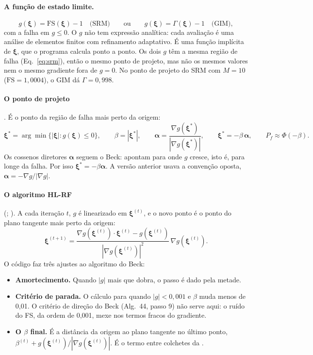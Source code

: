 \documentclass[11pt,a4paper]{article}
\newcommand{\xib}{\bm\xi}
\newcommand{\FS}{\mathrm{FS}}
\begin{document}
\paragraph{A função de estado limite.}
\begin{equation}
  g(\xib) = \FS(\xib) - 1 \quad\text{(SRM)} \qquad\text{ou}\qquad g(\xib) = \Gamma(\xib) - 1 \quad\text{(GIM)},
  \label{eq:g}
\end{equation}
com a falha em $g \le 0$. O $g$ não tem expressão analítica: cada avaliação é uma análise de elementos finitos com
refinamento adaptativo. É uma função implícita de $\xib$, que o programa calcula ponto a ponto. Os dois $g$ têm a mesma
região de falha (Eq.~\ref{eq:srm}), então o mesmo ponto de projeto, mas não os mesmos valores nem o mesmo gradiente fora
de $g = 0$. No ponto de projeto do SRM com $M = 10$ ($\FS = 1{,}0004$), o GIM dá $\Gamma = 0{,}998$.

\paragraph{O ponto de projeto} \citep[Eqs.~4.10 a 4.12 e 4.23]{beck2014}. É o ponto da região de falha mais perto da
origem:
\begin{equation}
  \xib^* = \arg\min\big\{|\xib| : g(\xib) \le 0\big\}, \qquad \beta = |\xib^*|, \qquad
  \bm\alpha = \frac{\nabla g(\xib^*)}{|\nabla g(\xib^*)|}, \qquad \xib^* = -\beta\,\bm\alpha, \qquad P_f \approx \Phi(-\beta).
  \label{eq:ponto}
\end{equation}
Os cossenos diretores $\bm\alpha$ seguem o Beck: apontam para onde $g$ cresce, isto é, para longe da falha. Por isso
$\xib^* = -\beta\bm\alpha$. A versão anterior usava a convenção oposta, $\bm\alpha = -\nabla g/|\nabla g|$.

\paragraph{O algoritmo HL-RF} (; \citealp[Eq.~4.28 e Alg.~44]{beck2014}). A cada
iteração $t$, $g$ é linearizado em $\xib^{(t)}$, e o novo ponto é o ponto do plano tangente mais perto da origem:
\begin{equation}
  \xib^{(t+1)} = \frac{\nabla g(\xib^{(t)})\cdot\xib^{(t)} - g(\xib^{(t)})}{|\nabla g(\xib^{(t)})|^2}\,\nabla g(\xib^{(t)}).
  \label{eq:hlrf}
\end{equation}
O código faz três ajustes ao algoritmo do Beck:
\begin{itemize}
  \item \textbf{Amortecimento.} Quando $|g|$ mais que dobra, o passo é dado pela metade.
  \item \textbf{Critério de parada.} O cálculo para quando $|g| < 0{,}001$ e $\beta$ muda menos de 0,01. O critério de
    direção do Beck (Alg.~44, passo 9) não serve aqui: o ruído do FS, da ordem de 0,001, mexe nos termos fracos do
    gradiente.
  \item \textbf{O $\beta$ final.} É a distância da origem ao plano tangente no último ponto,
    $\beta^{(t)} + g(\xib^{(t)})/|\nabla g(\xib^{(t)})|$. É o termo entre colchetes da \citet[Eq.~4.27]{beck2014}.
\end{itemize}
\end{document}
